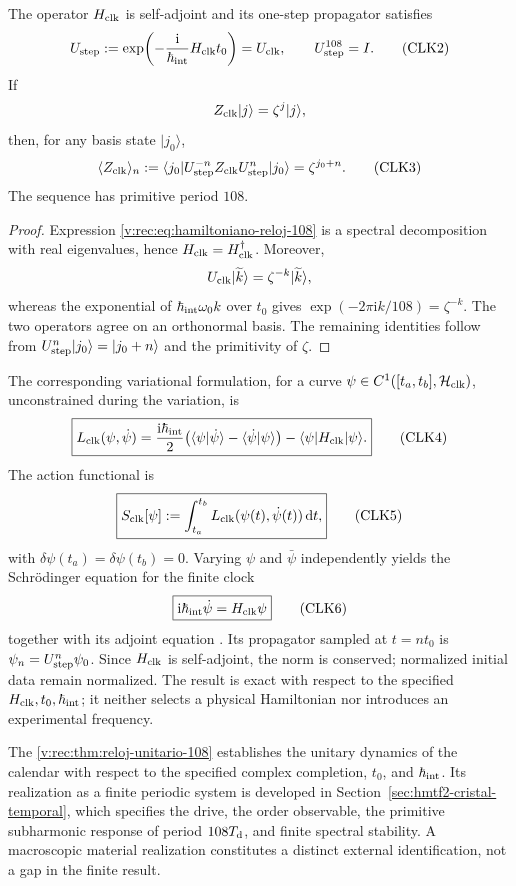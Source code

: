 \begin{theorem}
\label{v:rec:thm:reloj-unitario-108}
The operator \(H_{\rm clk}\) is self-adjoint and its one-step propagator
satisfies
\[
 U_{\rm step}
 :=\exp\!\left(-\frac{\mathrm i}{\hbar_{\rm int}}
 H_{\rm clk}t_0\right)
 =U_{\rm clk},
 \qquad
 U_{\rm step}^{108}=I.
 \tag{CLK2}\label{v:rec:eq:propagador-reloj-108}
\]
If
\[
 Z_{\rm clk}|j\rangle=\zeta^j|j\rangle,
\]
then, for any basis state \(|j_0\rangle\),
\[
 \langle Z_{\rm clk}\rangle_{n}
 :=\langle j_0|U_{\rm step}^{-n}Z_{\rm clk}
 U_{\rm step}^n|j_0\rangle
 =\zeta^{j_0+n}.
 \tag{CLK3}\label{v:rec:eq:respuesta-reloj-108}
\]
The sequence has primitive period \(108\).
\end{theorem}

\begin{proof}
Expression \eqref{v:rec:eq:hamiltoniano-reloj-108} is a spectral
decomposition with real eigenvalues, hence \(H_{\rm clk}=H_{\rm clk}^\dagger\).
Moreover,
\[
 U_{\rm clk}|\widetilde k\rangle
 =\zeta^{-k}|\widetilde k\rangle,
\]
whereas the exponential of
\(\hbar_{\rm int}\omega_0 k\) over \(t_0\) gives
\(\exp(-2\pi\mathrm ik/108)=\zeta^{-k}\). The two operators agree on
an orthonormal basis. The remaining identities follow from
\(U_{\rm step}^n|j_0\rangle=|j_0+n\rangle\) and the primitivity of
\(\zeta\).
\end{proof}

The corresponding variational formulation, for a curve
\(\psi\in C^1([t_a,t_b],\mathcal H_{\rm clk})\), unconstrained during the
variation, is
\[
 \boxed{
 L_{\rm clk}(\psi,\dot\psi)
 =\frac{\mathrm i\hbar_{\rm int}}2
 \bigl(
 \langle\psi|\dot\psi\rangle
 -\langle\dot\psi|\psi\rangle
 \bigr)
 -\langle\psi|H_{\rm clk}|\psi\rangle.}
 \tag{CLK4}\label{v:rec:eq:lagrangiano-reloj-108}
\]
The action functional is
\[
 \boxed{
 S_{\rm clk}[\psi]
 :=\int_{t_a}^{t_b}
 L_{\rm clk}(\psi(t),\dot\psi(t))\,\mathrm dt,}
 \tag{CLK5}\label{v:rec:eq:accion-reloj-108}
\]
with \(\delta\psi(t_a)=\delta\psi(t_b)=0\).
Varying \(\psi\) and \(\bar\psi\) independently yields the
Schrödinger equation for the finite clock
\[
 \boxed{\mathrm i\hbar_{\rm int}\dot\psi=H_{\rm clk}\psi}
 \tag{CLK6}\label{v:rec:eq:schrodinger-reloj-108}
\]
together with its adjoint equation \cite{SchrodingerNobel}. Its propagator sampled
at \(t=nt_0\) is \(\psi_n=U_{\rm step}^{n}\psi_0\). Since \(H_{\rm clk}\) is
self-adjoint, the norm is conserved; normalized initial data remain
normalized. The result is exact with respect to the specified
\(H_{\rm clk},t_0,\hbar_{\rm int}\); it neither selects a physical Hamiltonian
nor introduces an experimental frequency.

The \cref{v:rec:thm:reloj-unitario-108} establishes the unitary dynamics of the calendar
with respect to the specified complex completion, \(t_0\), and \(\hbar_{\rm int}\).
Its realization as a finite periodic system is developed
in Section~\ref{sec:hmtf2-cristal-temporal}, which
specifies the drive, the order observable, the primitive subharmonic response of period
\(108T_{\rm d}\), and finite spectral stability. A
macroscopic material realization constitutes a distinct external identification, not a
gap in the finite result.
